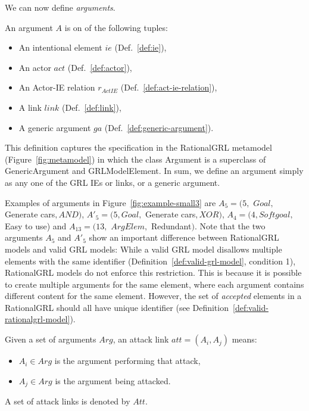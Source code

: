 We can now define \emph{arguments}. 

\begin{definition}[Argument]
\label{def:argument}
An argument $A$ is on of the following tuples:
\begin{itemize}
\item An intentional element $ie$ (Def.~\ref{def:ie}), 
\item An actor $act$ (Def.~\ref{def:actor}),
\item An Actor-IE relation $r_{ActIE}$ (Def.~\ref{def:act-ie-relation}), 
\item A link $link$ (Def.~\ref{def:link}),
\item A generic argument $ga$ (Def.~\ref{def:generic-argument}).
\end{itemize}
\end{definition}

This definition captures the specification in the RationalGRL metamodel (Figure~\ref{fig:metamodel}) in which the class \textsf{Argument} is a superclass of \textsf{GenericArgument} and \textsf{GRLModelElement}. In sum, we define an argument simply as any one of the GRL IEs or links, or a generic argument. 

Examples of arguments in Figure~\ref{fig:example-small3} are $A_5 = (5,$ $Goal,$ Generate cars$, AND)$, $A'_5 = (5, Goal,$ Generate cars$, XOR)$, $A_4 = (4, Softgoal,$ Easy to use) and $A_{13}=(13,$ $ArgElem,$ Redundant$)$. Note that the two arguments $A_5$ and $A'_5$ show an important difference between RationalGRL models and valid GRL models: While a valid GRL model disallows multiple elements with the same identifier (Definition~\ref{def:valid-grl-model}, condition 1), RationalGRL models do not enforce this restriction. This is because it is possible to create multiple arguments for the same element, where each argument contains different content for the same element. However, the set of \emph{accepted} elements in a RationalGRL should all have unique identifier (see Definition~\ref{def:valid-rationalgrl-model}).

\begin{definition}
\label{def:link:attack}
Given a set of arguments $Arg$, an attack link $att=(A_i,A_j)$ means:
\begin{itemize}
\item $A_i\in Arg$ is the argument performing that attack,
\item $A_j\in Arg$ is the argument being attacked.
\end{itemize}
A set of attack links is denoted by $Att$.
\end{definition}

